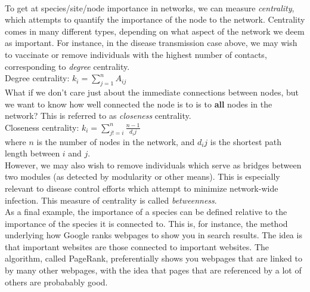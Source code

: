 \documentclass[12pt]{article}
\begin{document}
\paragraph*{}

To get at species/site/node importance in networks, we can measure \textit{centrality}, which attempts to quantify the importance of the node to the network. Centrality comes in many different types, depending on what aspect of the network we deem as important. For instance, in the disease transmission case above, we may wish to vaccinate or remove individuals with the highest number of contacts, corresponding to \textit{degree} centrality. \\


Degree centrality: $ k_i = \sum_{j=1}^{n} A_{ij}$ \\


What if we don't care just about the immediate connections between nodes, but we want to know how well connected the node is to is to \textbf{all} nodes in the network? This is referred to as \textit{closeness} centrality.  \\

Closeness centrality: $ k_i = \sum_{j!=i}^{n} \frac{n-1}{d_ij}$ \\

where $n$ is the number of nodes in the network, and $d_ij$ is the shortest path length between $i$ and $j$. \\




However, we may also wish to remove individuals which serve as bridges between two modules (as detected by modularity or other means). This is especially relevant to disease control efforts which attempt to minimize network-wide infection. This measure of centrality is called \textit{betweenness}. \\ 



As a final example, the importance of a species can be defined relative to the importance of the species it is connected to. This is, for instance, the method underlying how Google ranks webpages to show you in search results. The idea is that important websites are those connected to important websites. The algorithm, called PageRank, preferentially shows you webpages that are linked to by many other webpages, with the idea that pages that are referenced by a lot of others are probabably good. 
\end{document}

